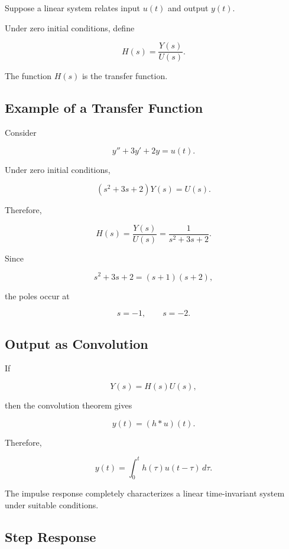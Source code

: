 Suppose a linear system relates input \(u(t)\) and output \(y(t)\).

Under zero initial conditions, define

\[
\boxed{
H(s)
=
\frac{
Y(s)
}{
U(s)
}.
}
\]

The function \(H(s)\) is the transfer function.

\subsection{Example of a Transfer Function}
\label{subsec:transfer-function-example}

Consider

\[
\boxed{
y''+3y'+2y=u(t).
}
\]

Under zero initial conditions,

\[
(s^2+3s+2)Y(s)
=
U(s).
\]

Therefore,

\[
\boxed{
H(s)
=
\frac{
Y(s)
}{
U(s)
}
=
\frac1{
s^2+3s+2
}.
}
\]

Since

\[
s^2+3s+2
=
(s+1)(s+2),
\]

the poles occur at

\[
\boxed{
s=-1,
\qquad
s=-2.
}
\]

\subsection{Output as Convolution}
\label{subsec:output-convolution}

If

\[
Y(s)
=
H(s)U(s),
\]

then the convolution theorem gives

\[
\boxed{
y(t)
=
(h*u)(t).
}
\]

Therefore,

\[
\boxed{
y(t)
=
\int_0^t
h(\tau)
u(t-\tau)
\,d\tau.
}
\]

The impulse response completely characterizes a linear time-invariant
system under suitable conditions.

\subsection{Step Response}
\label{subsec:step-response}

